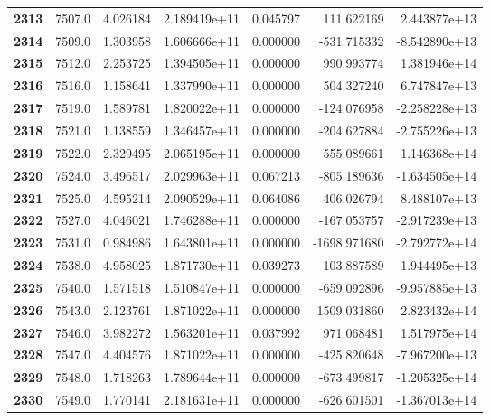 \documentclass{report}[12pt]
\begin{document}
\begin{center}
\begin{tabular}{lrrrrrr}
\textbf{2313} &         7507.0 &   4.026184 &  2.189419e+11 &    0.045797 &   111.622169 &  2.443877e+13 \\
\textbf{2314} &         7509.0 &   1.303958 &  1.606666e+11 &    0.000000 &  -531.715332 & -8.542890e+13 \\
\textbf{2315} &         7512.0 &   2.253725 &  1.394505e+11 &    0.000000 &   990.993774 &  1.381946e+14 \\
\textbf{2316} &         7516.0 &   1.158641 &  1.337990e+11 &    0.000000 &   504.327240 &  6.747847e+13 \\
\textbf{2317} &         7519.0 &   1.589781 &  1.820022e+11 &    0.000000 &  -124.076958 & -2.258228e+13 \\
\textbf{2318} &         7521.0 &   1.138559 &  1.346457e+11 &    0.000000 &  -204.627884 & -2.755226e+13 \\
\textbf{2319} &         7522.0 &   2.329495 &  2.065195e+11 &    0.000000 &   555.089661 &  1.146368e+14 \\
\textbf{2320} &         7524.0 &   3.496517 &  2.029963e+11 &    0.067213 &  -805.189636 & -1.634505e+14 \\
\textbf{2321} &         7525.0 &   4.595214 &  2.090529e+11 &    0.064086 &   406.026794 &  8.488107e+13 \\
\textbf{2322} &         7527.0 &   4.046021 &  1.746288e+11 &    0.000000 &  -167.053757 & -2.917239e+13 \\
\textbf{2323} &         7531.0 &   0.984986 &  1.643801e+11 &    0.000000 & -1698.971680 & -2.792772e+14 \\
\textbf{2324} &         7538.0 &   4.958025 &  1.871730e+11 &    0.039273 &   103.887589 &  1.944495e+13 \\
\textbf{2325} &         7540.0 &   1.571518 &  1.510847e+11 &    0.000000 &  -659.092896 & -9.957885e+13 \\
\textbf{2326} &         7543.0 &   2.123761 &  1.871022e+11 &    0.000000 &  1509.031860 &  2.823432e+14 \\
\textbf{2327} &         7546.0 &   3.982272 &  1.563201e+11 &    0.037992 &   971.068481 &  1.517975e+14 \\
\textbf{2328} &         7547.0 &   4.404576 &  1.871022e+11 &    0.000000 &  -425.820648 & -7.967200e+13 \\
\textbf{2329} &         7548.0 &   1.718263 &  1.789644e+11 &    0.000000 &  -673.499817 & -1.205325e+14 \\
\textbf{2330} &         7549.0 &   1.770141 &  2.181631e+11 &    0.000000 &  -626.601501 & -1.367013e+14 \\

\end{tabular}
\end{center}
\end{document}
